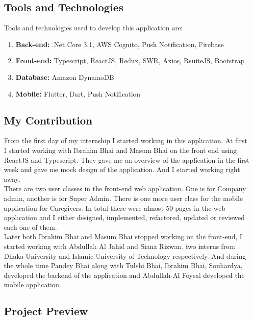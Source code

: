 \subsection{Tools and Technologies}

Tools and technologies used to develop this application are:

\begin{enumerate}
    \item \textbf{Back-end:} .Net Core 3.1, AWS Cognito, Push Notification, Firebase
    \item \textbf{Front-end:} Typescript, ReactJS, Redux, SWR, Axios, RsuiteJS, Bootstrap
    \item \textbf{Database:} Amazon DynamoDB
    \item \textbf{Mobile:} Flutter, Dart, Push Notification
\end{enumerate}

\subsection{My Contribution}

From the first day of my internship I started working in this application.
At first I started working with Ibrahim Bhai and Masum Bhai on the front end using ReactJS and Typescript.
They gave me an overview of the application in the first week and gave me mock design of the application.
And I started working right away.\\

There are two user classes in the front-end web application.
One is for Company admin, another is for Super Admin.
There is one more user class for the mobile application for Caregivers.
In total there were almost 50 pages in the web application and I either designed, implemented, refactored, updated or reviewed each one of them.\\

Later both Ibrahim Bhai and Masum Bhai stopped working on the front-end, I started working with Abdullah Al Jahid and Siana Rizwan, two interns from Dhaka University and Islamic University of Technology respectively.
And during the whole time Pandey Bhai along with Tulshi Bhai, Ibrahim Bhai, Souhardya, developed the backend of the application and Abdullah-Al Foysal developed the mobile application.

\subsection{Project Preview}

